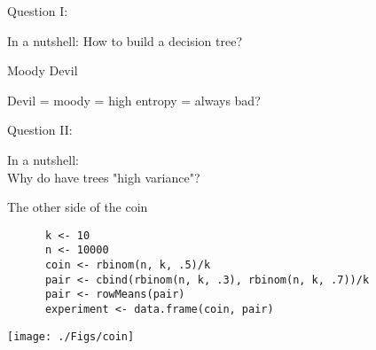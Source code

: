 \documentclass[12pt,t]{beamer}
\begin{document}
{\begin{frame}[c]{Question I:}
\begin{center}
  \Large \textcolor{lolit}{In a nutshell:} How to build a decision tree?
\end{center}
\end{frame}

\begin{frame}[c]{Moody Devil}
  \begin{center}
    Devil = moody
     = 
    high entropy 
     = 
    always bad?\\
  \end{center}
\end{frame}

\begin{frame}[c]{Question II:}
\begin{center}
  \Large \textcolor{lolit}{In a nutshell:}\\ Why do have trees "high variance"?
\end{center}
\end{frame}

\begin{frame}[fragile]{The other side of the coin}
  \begin{center}
  \end{center}
\end{frame}

\begin{frame}[fragile]
  \begin{center}
  \begin{minipage}{\textwidth}
    \begin{lstlisting}
      k <- 10
      n <- 10000
      coin <- rbinom(n, k, .5)/k
      pair <- cbind(rbinom(n, k, .3), rbinom(n, k, .7))/k
      pair <- rowMeans(pair)
      experiment <- data.frame(coin, pair)
     \end{lstlisting}
   \end{minipage}
   \texttt{[image: ./Figs/coin]}
   \end{center}
\end{frame}

}
\end{document}
